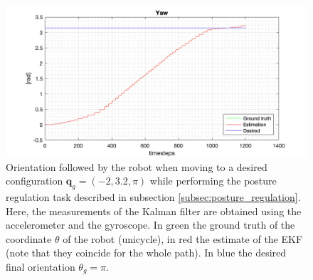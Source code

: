 \documentclass[a4paper]{article}
\begin{document}
\begin{figure}
    \centering
    \includegraphics[width=\textwidth]{images/yaw_postureregulation.png}
    \caption{Orientation followed by the robot when moving to a desired configuration
        $\bm{q}_g = (-2, 3.2, \pi)$ while performing the posture regulation task
        described in subsection \ref{subsec:posture_regulation}.
        Here, the measurements of the Kalman filter are obtained
        using the accelerometer and the gyroscope. In green the ground truth of the coordinate $\theta$ of the
        robot (unicycle), in red the estimate of the EKF (note that they coincide
        for the whole path). In blue the desired final orientation $\theta_g = \pi$.}
    \label{fig:walk_to_desired_position_yaw}
\end{figure}
\end{document}
